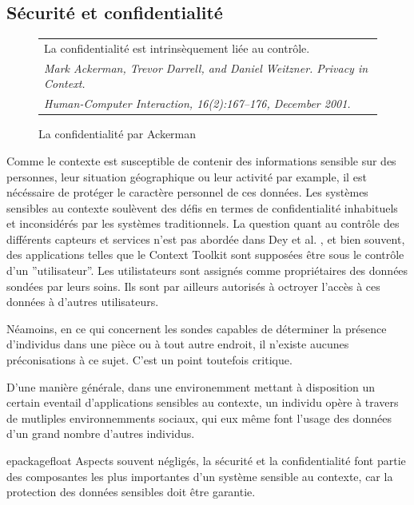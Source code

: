 \subsection{Sécurité et confidentialité}

\begin{figure}[h]
  \centering
  \begin{tabular}{l}
    La confidentialité est intrinsèquement liée au contrôle.
    \cite{ackerman_privacy_2001} \\
    \em \footnotesize Mark Ackerman, Trevor Darrell, and Daniel Weitzner. 
    Privacy in Context. \\
    \em \footnotesize Human-Computer Interaction, 16(2):167–176, December 2001.
    \\
  \end{tabular}
  \caption{La confidentialité par Ackerman}
  \label{fig:quote}
\end{figure}


Comme le contexte est susceptible de contenir des informations sensible sur des
personnes, leur situation géographique ou leur activité par example, il est
nécéssaire de protéger le caractère personnel de ces données. Les systèmes
sensibles au contexte soulèvent des défis en termes de confidentialité
inhabituels et inconsidérés par les systèmes traditionnels. La question quant au
contrôle des différents capteurs et services n'est pas abordée dans Dey et al.
\cite{dey_conceptual_2001}, et bien souvent, des applications telles que le
Context Toolkit sont supposées être sous le contrôle d'un ''utilisateur''. Les
utilistateurs sont assignés comme propriétaires des données sondées par leurs
soins. Ils sont par ailleurs autorisés à octroyer l'accès à ces données à
d'autres utilisateurs.

Néamoins, en ce qui concernent les sondes capables de déterminer la présence
d'individus dans une pièce ou à tout autre endroit, il n'existe aucunes
préconisations à ce sujet. C'est un point toutefois critique.

D'une manière générale, dans une environemment mettant à
disposition un certain eventail d'applications sensibles au contexte, un individu opère
à travers de mutliples environnemments sociaux, qui eux même font l'usage des
données d'un grand nombre d'autres individus.

epackage{float}
Aspects souvent négligés, la sécurité et la confidentialité font partie des
composantes les plus importantes d'un système sensible au contexte, car la
protection des données sensibles doit être garantie.

